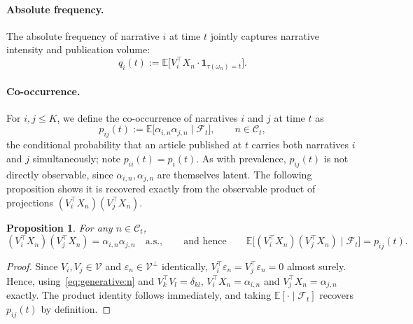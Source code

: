 \documentclass[
  journal=medium,
  manuscript=article-type,
  year=2025,
  volume=1,
]{cup-journal}
\newtheorem{proposition}{Proposition}
\begin{document}
\paragraph{Absolute frequency.}
The absolute frequency of narrative $i$ at time $t$ jointly captures
narrative intensity and publication volume:
\begin{equation}
    \label{eq:abs_freq}
    q_i(t) := \mathbb E\bigl[V_i^\top X_n \cdot \mathbf 1_{\tau(\omega_n) = t}\bigr].
\end{equation}

\paragraph{Co-occurrence.}
For $i,j\le K$, we define the co-occurrence of narratives $i$ and $j$ at time
$t$ as
\begin{equation}
    \label{eq:cooccurrence}
    p_{ij}(t) := \mathbb E\bigl[\alpha_{i,n}\alpha_{j,n} \mid \mathcal F_t\bigr], \qquad n\in\mathcal C_t,
\end{equation}
the conditional probability that an article published at $t$ carries both
narratives $i$ and $j$ simultaneously; note $p_{ii}(t)=p_i(t)$. As with
prevalence, $p_{ij}(t)$ is not directly observable, since
$\alpha_{i,n},\alpha_{j,n}$ are themselves latent. The following proposition
shows it is recovered exactly from the
observable product of projections $(V_i^\top X_n)(V_j^\top X_n)$.

\begin{proposition}
\label{prop:cooccurrence-projection}
For any $n\in\mathcal C_t$,
\begin{equation}
    (V_i^\top X_n)(V_j^\top X_n) = \alpha_{i,n}\alpha_{j,n} \quad \text{a.s.},
    \qquad\text{and hence}\qquad
    \mathbb E\bigl[(V_i^\top X_n)(V_j^\top X_n)\mid \mathcal F_t\bigr] = p_{ij}(t).
\end{equation}
\end{proposition}

\begin{proof}
Since $V_i,V_j\in\mathcal V$ and $\varepsilon_n\in\mathcal V^\perp$
identically, $V_i^\top\varepsilon_n =
V_j^\top\varepsilon_n = 0$ almost surely. Hence, using~\eqref{eq:generative:n}
and $V_k^\top V_l=\delta_{kl}$, $V_i^\top X_n = \alpha_{i,n}$ and $V_j^\top
X_n = \alpha_{j,n}$ exactly. The product identity follows immediately, and
taking $\mathbb E[\cdot\mid\mathcal F_t]$ recovers $p_{ij}(t)$ by
definition.
\end{proof}
\end{document}
